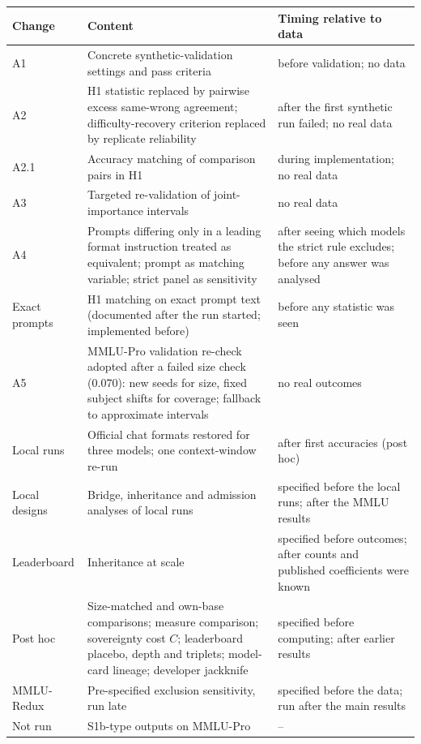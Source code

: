 \documentclass[preprint,12pt,authoryear]{elsarticle}
\begin{document}
{\renewcommand{\arraystretch}{1.25}%
\begin{longtable}{@{}>{\raggedright\arraybackslash}p{}>{\raggedright\arraybackslash}p{}>{\raggedright\arraybackslash}p{}@{}}
\toprule
Change & Content & Timing relative to data \\
\midrule
\endhead
A1 & Concrete synthetic-validation settings and pass criteria & before validation; no data \\
A2 & H1 statistic replaced by pairwise excess same-wrong agreement; difficulty-recovery criterion replaced by replicate reliability & after the first synthetic run failed; no real data \\
A2.1 & Accuracy matching of comparison pairs in H1 & during implementation; no real data \\
A3 & Targeted re-validation of joint-importance intervals & no real data \\
A4 & Prompts differing only in a leading format instruction treated as equivalent; prompt as matching variable; strict panel as sensitivity & after seeing which models the strict rule excludes; before any answer was analysed \\
Exact prompts & H1 matching on exact prompt text (documented after the run started; implemented before) & before any statistic was seen \\
A5 & MMLU-Pro validation re-check adopted after a failed size check (0.070): new seeds for size, fixed subject shifts for coverage; fallback to approximate intervals & no real outcomes \\
Local runs & Official chat formats restored for three models; one context-window re-run & after first accuracies (post hoc) \\
Local designs & Bridge, inheritance and admission analyses of local runs & specified before the local runs; after the MMLU results \\
Leaderboard & Inheritance at scale & specified before outcomes; after counts and published coefficients were known \\
Post hoc & Size-matched and own-base comparisons; measure comparison; sovereignty cost $C$; leaderboard placebo, depth and triplets; model-card lineage; developer jackknife & specified before computing; after earlier results \\
MMLU-Redux & Pre-specified exclusion sensitivity, run late & specified before the data; run after the main results \\
Not run & S1b-type outputs on MMLU-Pro & -- \\
\bottomrule
\end{longtable}}
\end{document}
